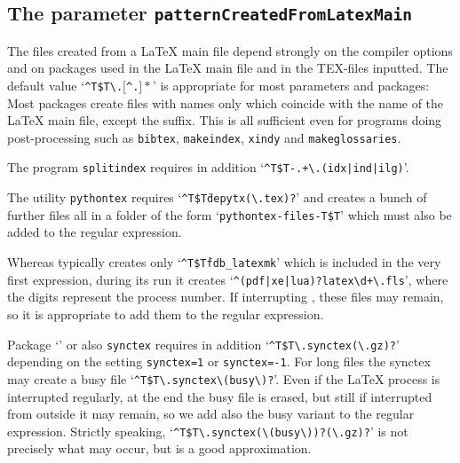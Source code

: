 \subsection{The parameter \texttt{patternCreatedFromLatexMain}}%
\label{subsec:patternCreatedFromLatexMain}

The files created from a \LaTeX{} main file 
depend strongly on the compiler options 
and on packages used in the \LaTeX{} main file 
and in the TEX-files inputted. 
The default value 
`\texttt{\^{}T\$T\textbackslash.$[$\^{}.$]*$}' 
is appropriate for most parameters and packages: 
Most packages create files with names only 
which coincide with the name of the \LaTeX{} main file, except the suffix. 
This is all sufficient even for programs doing post-processing 
such as \texttt{bibtex}, \texttt{makeindex}, \texttt{xindy} and 
\texttt{makeglossaries}. 

The program \texttt{splitindex} requires in addition 
`\texttt{\^{}T\$T-.+\textbackslash.(idx|ind|ilg)}'. %

The utility \texttt{pythontex} requires 
`\texttt{\^{}T\$T\.depytx(\textbackslash.tex)?}' %
and creates a bunch of further files all in a folder of the form 
`\texttt{pythontex-files-T\$T}' which must also be added to the regular expression. 

Whereas typically  creates only `\texttt{\^{}T\$T\.fdb\_latexmk}' 
which is included in the very first expression, 
during its run it creates `\texttt{\^{}(pdf|xe|lua)?latex\textbackslash d+\textbackslash.fls}', %
where the digits represent the process number. 
If interrupting , these files may remain, 
so it is appropriate to add them to the regular expression. 

Package `' or also \texttt{synctex} requires in addition 
`\texttt{\^{}T\$T\textbackslash.synctex(\textbackslash.gz)?}' depending on the setting %
\texttt{synctex=1} or \texttt{synctex=-1}. 
For long files the synctex may create a busy file 
`\texttt{\^{}T\$T\textbackslash.synctex\textbackslash(busy\textbackslash)?}'. 
Even if the \LaTeX{} process is interrupted regularly, 
at the end the busy file is erased, 
but still if interrupted from outside it may remain, 
so we add also the busy variant to the regular expression. 
Strictly speaking, 
`\texttt{\^{}T\$T\textbackslash.synctex(\textbackslash(busy\textbackslash))?(\textbackslash.gz)?}' %
is not precisely what may occur, but is a good approximation. 

